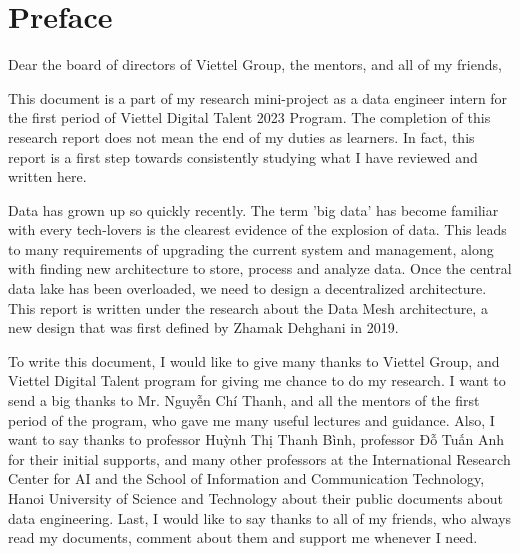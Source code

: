 \documentclass[12pt, a4paper]{book}
\begin{document}
 
	
    \raggedbottom
    \clearpage
    \thispagestyle{empty}
    
    \begingroup
    \normalsize
\chapter*{Preface}
\justifying
{}
Dear the board of directors of Viettel Group, the mentors, and all of my friends,

This document is a part of my research mini-project as a data engineer intern for the first period of Viettel Digital Talent 2023 Program. The completion of this research report does not mean the end of my duties as learners. In fact, this report is a first step towards consistently studying what I have reviewed and written here.

Data has grown up so quickly recently. The term 'big data' has become familiar with every tech-lovers is the clearest evidence of the explosion of data. This leads to many requirements of upgrading the current system and management, along with finding new architecture to store, process and analyze data. Once the central data lake has been overloaded, we need to design a decentralized architecture. This report is written under the research about the Data Mesh architecture, a new design that was first defined by Zhamak Dehghani in 2019.

To write this document, I would like to give many thanks to Viettel Group, and Viettel Digital Talent program for giving me chance to do my research. I want to send a big thanks to Mr. Nguyễn Chí Thanh, and all the mentors of the first period of the program, who gave me many useful lectures and guidance. Also, I want to say thanks to professor Huỳnh Thị Thanh Bình, professor Đỗ Tuấn Anh for their initial supports, and many other professors at the International Research Center for AI and the School of Information and Communication Technology, Hanoi University of Science and Technology about their public documents about data engineering. Last, I would like to say thanks to all of my friends, who always read my documents, comment about them and support me whenever I need.
\end{document}
